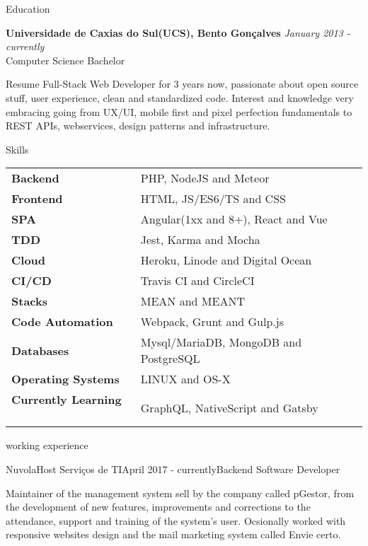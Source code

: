 \documentclass{resume} %
\begin{document}
\begin{rSection}{Education}

{\bf Universidade de Caxias do Sul(UCS), Bento Gon\c{c}alves} \hfill {\em January 2013 - currently} 
\\ Computer Science Bachelor

\end{rSection}

\begin{rSection}{Resume}
 Full-Stack Web Developer for 3 years now, passionate about open source stuff, user experience, clean and standardized code. Interest and knowledge very embracing going from UX/UI, mobile first and pixel perfection fundamentals to REST APIs, webservices, design patterns and infrastructure.
\end{rSection}

\begin{rSection}{Skills}

\begin{tabular}{ @{} >{\bfseries}l @{\hspace{6ex}} l }
Backend \ & PHP, NodeJS and Meteor \\
Frontend \ & HTML, JS/ES6/TS and CSS \\
SPA  \ & Angular(1xx and 8+), React and Vue \\
TDD \ & Jest, Karma and Mocha \\
Cloud \ & Heroku, Linode and Digital Ocean \\
CI/CD \ & Travis CI and CircleCI \\
Stacks \ & MEAN and MEANT \\
Code Automation \ & Webpack, Grunt and Gulp.js \\
Databases & Mysql/MariaDB, MongoDB and PostgreSQL \\
Operating Systems & LINUX and OS-X \\
Currently Learning \ & GraphQL, NativeScript and Gatsby

\end{tabular}

\end{rSection}

\begin{rSection}{working experience}

\begin{rSubsection}{NuvolaHost Servi\c{c}os de TI}{April 2017 - currently}{Backend Software Developer}{}
\item Maintainer of the management system sell by the company called pGestor, from the development of new features, improvements and corrections to the attendance, support and training of the system's user. Ocsionally worked with  responsive websites design and the mail marketing system called Envie certo.
\end{rSubsection}


\end{rSection}
\end{document}
